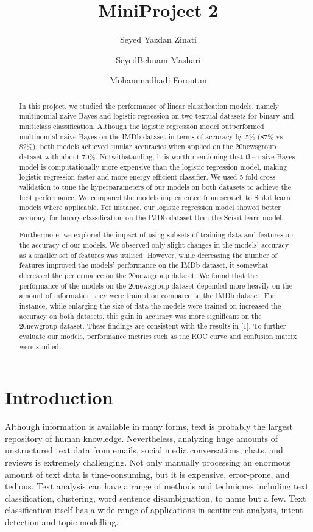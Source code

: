 \documentclass[10pt]{article}
\begin{document}
\title{MiniProject 2}
\author{
    Seyed Yazdan Zinati
    \and
    SeyedBehnam Mashari
    \and
    Mohammadhadi Foroutan
}

\maketitle

\begin{abstract}
    In this project, we studied the performance of linear classification models, namely multinomial naive Bayes and logistic regression on two textual datasets for binary and multiclass classification. Although the logistic regression model outperformed multinomial naive Bayes on the IMDb dataset in terms of accuracy by 5\% (87\% vs 82\%), both models achieved similar accuracies when applied on the 20newsgroup dataset with about 70\%. Notwithstanding, it is worth mentioning that the naive Bayes model is computationally more expensive than the logistic regression model, making logistic regression faster and more energy-efficient classifier. We used 5-fold cross-validation to tune the hyperparameters of our models on both datasets to achieve the best performance. We compared the models implemented from scratch to Scikit learn models where applicable. For instance, our logistic regression model showed better accuracy for binary classification on the IMDb dataset than the Scikit-learn model.

    Furthermore, we explored the impact of using subsets of training data and features on the accuracy of our models. We observed only slight changes in the models' accuracy as a smaller set of features was utilised. However, while decreasing the number of features improved the models' performance on the IMDb dataset, it somewhat decreased the performance on the 20newsgroup dataset. We found that the performance of the models on the 20newsgroup dataset depended more heavily on the amount of information they were trained on compared to the IMDb dataset. For instance, while enlarging the size of data the models were trained on increased the accuracy on both datasets, this gain in accuracy was more significant on the 20newgroup dataset. These findings are consistent with the results in [1]. To further evaluate our models, performance metrics such as the ROC curve and confusion matrix were studied.
\end{abstract}

\section{Introduction}
Although information is available in many forms, text is probably the largest repository of human knowledge. Nevertheless, analyzing huge amounts of unstructured text data from emails, social media conversations, chats, and reviews is extremely challenging. Not only manually processing an enormous amount of text data is time-consuming, but it is expensive, error-prone, and tedious. Text analysis can have a range of methods and techniques including text classification, clustering, word sentence disambiguation, to name but a few. Text classification itself has a wide range of applications in sentiment analysis, intent detection and topic modelling.
\end{document}
